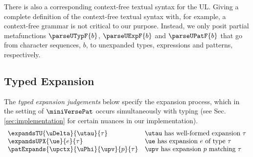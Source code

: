 \documentclass[acmsmall]{acmart}
\begin{document}
There is also a corresponding context-free textual syntax for the UL. 
Giving a complete definition of the context-free textual syntax with, for example, a context-free grammar is not critical to our purpose. 
Instead, we only posit partial metafunctions $\parseUTypF{b}$, $\parseUExpF{b}$ and $\parseUPatF{b}$  that go from character sequences, $b$, to unexpanded types, expressions and patterns, respectively.



\vspace{-5px}
\subsection{Typed Expansion}\label{sec:typed-expansion-U}\label{sec:s-TE}
The \emph{typed expansion judgements} below specify the expansion process, which in the setting of $\miniVersePat$ occurs simultaneously with typing (see Sec. \ref{sec:implementation} for certain nuances in our implementation).
\[\begin{array}{ll}
\expandsTU{\uDelta}{\utau}{\tau} & \text{$\utau$ has well-formed expansion $\tau$}\\
\expandsUPX{\ue}{e}{\tau} & \text{$\ue$ has expansion $e$ of type $\tau$}\\
\patExpands{\upctx}{\uPhi}{\upv}{p}{\tau} & \text{$\upv$ has expansion $p$ matching $\tau$}
\end{array}\]
\end{document}
